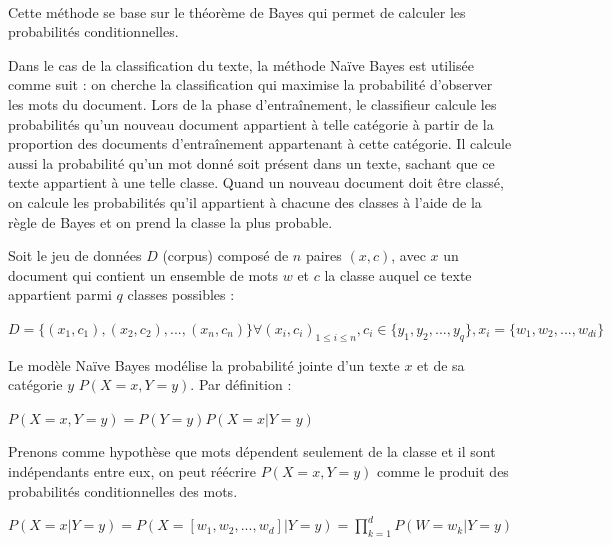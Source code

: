 \documentclass{article}
\begin{document}
 \paragraph{} Cette méthode se base sur le théorème de Bayes qui permet de calculer les probabilités conditionnelles. 
 
 Dans le cas de la classification du texte, la méthode Naïve Bayes est utilisée comme suit : on cherche la classification qui maximise la probabilité d'observer les mots du document. Lors de la phase d'entraînement, le classifieur calcule les probabilités qu'un nouveau document appartient à telle catégorie à partir de la proportion des documents d'entraînement appartenant à cette catégorie. 
 Il calcule aussi la probabilité qu'un mot donné soit présent dans un texte, sachant que ce texte appartient à une telle classe. Quand un nouveau document doit être classé, on calcule les probabilités qu'il appartient à chacune des classes à l'aide de la règle de Bayes et on prend la classe la plus probable.



Soit le jeu de données $D$ (corpus) composé de $n$ paires $(x,c)$, avec $x$ un document qui contient un ensemble de mots $w$ et $c$ la classe auquel ce texte appartient parmi $q$ classes possibles :
\newline

\begin{center}
$D=\{(x_1,c_1),(x_2,c_2),...,(x_n,c_n)\}  \forall (x_i,c_i)_{1 \leq i \leq n}, c_i \in \{y_1,y_2,...,y_q\}, x_i=\{w_1,w_2,...,w_{di}\}$

\end{center}



Le modèle Naïve Bayes modélise la probabilité jointe d'un texte $x$ et de sa catégorie $y$ $P(X=x , Y=y)$. Par définition  :
\newline

\begin{center}
$P(X=x,Y=y)=P(Y=y)P(X=x|Y=y)$
\end{center}

Prenons comme hypothèse que mots dépendent seulement de la classe et il sont indépendants entre eux, on peut réécrire $P(X=x , Y=y)$ comme le produit des probabilités conditionnelles des mots.
\newline

\begin{center}
$P(X=x|Y=y)=P(X=[w_1,w_2,...,w_d]|Y=y)=\prod_{k=1}^d P(W=w_k|Y=y)$
\end{center}
\end{document}
